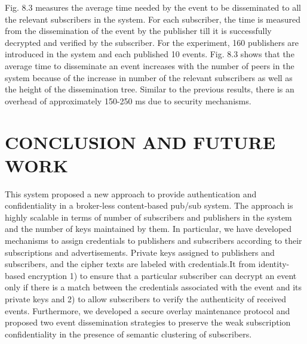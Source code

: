 \documentclass[MTech]{iitmdiss}
\begin{document}
Fig. 8.3 measures the average time needed by the event
to be disseminated to all the relevant subscribers in the
system. For each subscriber, the time is measured from the
dissemination of the event by the publisher till it is
successfully decrypted and verified by the subscriber. For
the experiment, 160 publishers are introduced in the
system and each published 10 events. Fig. 8.3 shows that
the average time to disseminate an event increases with
the number of peers in the system because of the increase
in number of the relevant subscribers as well as the height
of the dissemination tree. Similar to the previous results,
there is an overhead of approximately 150-250 ms due to
security mechanisms.

\chapter{CONCLUSION AND FUTURE WORK}
This system proposed a new approach to provide
authentication and confidentiality in a broker-less content-based pub/sub system. The approach is highly scalable in
terms of number of subscribers and publishers in the
system and the number of keys maintained by them. In
particular, we have developed mechanisms to assign
credentials to publishers and subscribers according to their
subscriptions and advertisements. Private keys assigned to
publishers and subscribers, and the cipher texts are labeled
with credentials.It from identity-based encryption 1) to ensure that a particular subscriber
can decrypt an event only if there is a match between the
credentials associated with the event and its private keys
and 2) to allow subscribers to verify the authenticity of
received events. Furthermore, we developed a secure
overlay maintenance protocol and proposed two event
dissemination strategies to preserve the weak subscription
confidentiality in the presence of semantic clustering of
subscribers.
\end{document}
